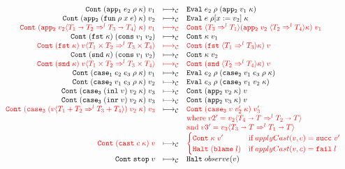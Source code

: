 \documentclass[acmsmall,review,anonymous]{acmart}\settopmatter{printfolios=true,printccs=false,printacmref=false}
\newcommand{\plus}[0]{+}
\newcommand{\sOOinspect}[3]{\mathtt{Eval} \; #1 \; #2 \; #3}
\newcommand{\sOOreturn}[2]{\mathtt{Cont} \; #2 \; #1}
\newcommand{\sOOhalt}[1]{\mathtt{Halt} \; #1}
\newcommand{\POOfun}[2]{#1 \shortrightarrow #2}
\newcommand{\POOprod}[2]{#1 \times #2}
\newcommand{\POOsum}[2]{#1 \plus #2}
\newcommand{\cOOcast}[3]{#1 \Rightarrow^{#2} #3}
\newcommand{\oOOblame}[1]{\mathtt{blame} \; #1}
\newcommand{\vOOcast}[2]{#1\langle#2\rangle}
\newcommand{\vOOfun}[3]{\mathtt{fun} \; #1 \; #2 \; #3}
\newcommand{\vOOcons}[2]{\mathtt{cons}\;#1\;#2}
\newcommand{\vOOinl}[1]{\mathtt{inl}\;#1}
\newcommand{\vOOinr}[1]{\mathtt{inr}\;#1}
\newcommand{\rOOsucc}[1]{\mathtt{succ}\;#1}
\newcommand{\rOOfail}[1]{\mathtt{fail}\;#1}
\newcommand{\kOOmt}[0]{\mathtt{stop}}
\newcommand{\kOOappI}[3]{
	\mathtt{app_1} \; #1 \; #2 \; #3
}
\newcommand{\kOOappII}[2]{
	\mathtt{app_2} \; #1 \; #2}
\newcommand{\kOOcaseI}[4]{
	\mathtt{case_1} \; #1 \; #2 \; #3 \; #4}
\newcommand{\kOOcaseII}[4]{
	\mathtt{case_2} \; #1 \; #2 \; #3 \; #4}
\newcommand{\kOOcaseIII}[3]{
	\mathtt{case_3} \; #1 \; #2 \; #3}
\newcommand{\sidecond}[1]{\text{if}\;#1}
\newcommand{\redrule}[3]{#1 & \longmapsto_\mathcal{C} & #2 & #3\\}
\newcommand{\hiredrule}[3]{\highlight{#1} & \highlight{\longmapsto_\mathcal{C}} & \highlight{#2} & \highlight{#3} \\}
\newcommand{\highlight}[1]{{\color{red} #1}}
\begin{document}
\begin{figure}
\[\begin{array}{rclr}
\redrule{
\sOOreturn{v_1}{(\kOOappI{e_2}{\rho}{\kappa})}}{
\sOOinspect{e_2}{\rho}{(\kOOappII{v_1}{\kappa})}}{}

\redrule{
\sOOreturn{v_2}{(\kOOappII{(\vOOfun{\rho}{x}{e})}{\kappa})}}{
\sOOinspect{e}{\rho[x:=v_2]}{\kappa}}{}
	\hiredrule{
		\sOOreturn{v_1}{(\mathtt{app_2} \; \vOOcast{v_2}{
				\cOOcast{\POOfun{T_1}{T_2}}{l}{\POOfun{T_3}{T_4}}
			} \; \kappa)}
	}{
		\sOOreturn{v_1}{
			\langle\cOOcast{T_3}{l}{T_1}\rangle
			(\mathtt{app_2} \; v_2 \; 
			\langle\cOOcast{T_2}{l}{T_4}\rangle \kappa)}
	}{}
	\redrule{
	\sOOreturn{
		(\vOOcons{v_1}{v_2})
	}{(\mathtt{fst} \; \kappa)}
	}{
	\sOOreturn{v_1}{\kappa}
	}{}
	\hiredrule{
		\sOOreturn{
			\vOOcast{v}{\cOOcast{\POOprod{T_1}{T_2}}{l}{
					\POOprod{T_3}{T_4}}}
		}{(\mathtt{fst} \; \kappa)}
	}{
		\sOOreturn{v}{(
			\mathtt{fst} \;
			\langle \cOOcast{T_1}{l}{T_3} \rangle \kappa
			)}
	}{}
	\redrule{
	\sOOreturn{
		(\vOOcons{v_1}{v_2})
	}{(\mathtt{snd} \; \kappa)}
	}{
	\sOOreturn{v_2}{\kappa}
	}{}
	
	\hiredrule{
		\sOOreturn{
			\vOOcast{v}{\cOOcast{\POOprod{T_1}{T_2}}{l}{
					\POOprod{T_3}{T_4}}}
		}{(\mathtt{snd} \; \kappa)}
	}{
		\sOOreturn{v}{(
			\mathtt{snd} \;
			\langle \cOOcast{T_2}{l}{T_4} \rangle \kappa
			)}
	}{}

\redrule{
\sOOreturn{v_1}{(\kOOcaseI{e_2}{e_3}{\rho}{\kappa})}}{
\sOOinspect{e_2}{\rho}{(\kOOcaseII{v_1}{e_3}{\rho}{\kappa})}}{}

\redrule{
\sOOreturn{v_2}{(\kOOcaseII{v_1}{e_3}{\rho}{\kappa})}}{
\sOOinspect{e_3}{\rho}{
	(\kOOcaseIII{v_1}{v_2}{\kappa})
}}{}	

\redrule{
\sOOreturn{v_3}{(\mathtt{case_3}\;(\vOOinl{v})\;v_2\;\kappa)}
}{
\sOOreturn{v}{(\kOOappII{v_2}{\kappa})}
}{}

\redrule{
	\sOOreturn{v_3}{(\mathtt{case_3}\;(\vOOinr{v})\;v_2\;\kappa)}
}{
\sOOreturn{v}{(\kOOappII{v_3}{\kappa})}
}{}

\redrule{
	\highlight{\sOOreturn{v_3}{(\mathtt{case_3}\;
		(\vOOcast{v}{\cOOcast{\POOsum{T_1}{T_2}}{l}{\POOsum{T_3}{T_4}}})
		\;v_2\;\kappa)}}
}{
	\highlight{\sOOreturn{v_3'}{
		(\mathtt{case_3}\;v
		\;v_2'\;\kappa)
	}}
}{\\&&
\highlight{\text{where}\;
v2' = \vOOcast{v_2}{\cOOcast{\POOfun{T_4}{T}}{l}{\POOfun{T_2}{T}}}}
\\&&
\highlight{\text{and}\;
v3' = \vOOcast{v_3}{\cOOcast{\POOfun{T_3}{T}}{l}{\POOfun{T_1}{T}}}}
}
	
	\redrule{
		\highlight{\sOOreturn{v}{(
			\mathtt{cast} \; c \; \kappa
			)}}
	}{
\highlight{          
\begin{cases}
	\sOOreturn{v'}{\kappa} & \sidecond{applyCast(v,c) = \rOOsucc{v'}}
	\\
	\sOOhalt{(\oOOblame{l})} & \sidecond{applyCast(v,c) = \rOOfail{l}}
\end{cases}}
	}{}
\redrule{
\sOOreturn{v}{\kOOmt}}{
\sOOhalt{observe(v)}}{}
	\end{array}
	\]	
	

\end{figure}
\end{document}
